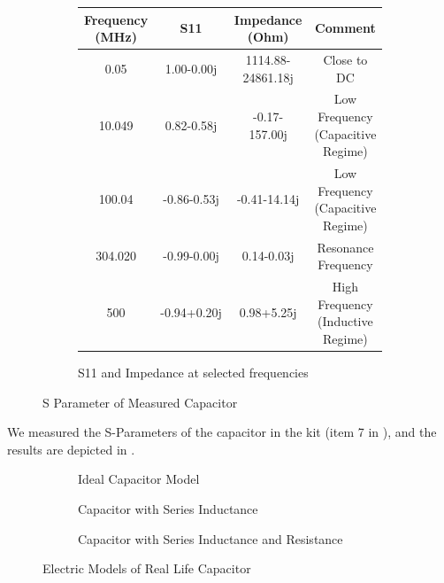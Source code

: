 \documentclass{article}
\begin{document}
\begin{figure}[h]
    \begin{subfigure}{\linewidth}
        \centering
        \begin{tabular}{ |c|c|c|c| }
            \hline
            Frequency (MHz) & S11         & Impedance (Ohm)   & Comment
            \\\hline
            0.05            & 1.00-0.00j  & 1114.88-24861.18j & Close to DC
            \\\hline
            10.049          & 0.82-0.58j  & -0.17-157.00j     & Low Frequency (Capacitive Regime)
            \\\hline
            100.04          & -0.86-0.53j & -0.41-14.14j      & Low Frequency (Capacitive Regime)
            \\\hline
            304.020         & -0.99-0.00j & 0.14-0.03j        & Resonance Frequency
            \\\hline
            500             & -0.94+0.20j & 0.98+5.25j        & High Frequency (Inductive Regime)
            \\\hline
        \end{tabular}
        \caption{S11 and Impedance at selected frequencies}
        \label{tab:capacitor_meas}
    \end{subfigure}

    \caption{S Parameter of Measured Capacitor}
    \label{fig:capacitor_meas}
\end{figure}

We measured the S-Parameters of the capacitor in the kit (item 7 in ), and the results are depicted in .

\begin{figure}
    \centering
    \begin{subfigure}{.5\linewidth}
        \centering
        \caption{Ideal Capacitor Model}
        \label{fig:capacitor_c}
    \end{subfigure}%
    \begin{subfigure}{.5\linewidth}
        \centering
        \caption{Capacitor with Series Inductance}
        \label{fig:capacitor_cl}
    \end{subfigure}%

    \begin{subfigure}{.5\linewidth}
        \centering
        \caption{Capacitor with Series Inductance and Resistance}
        \label{fig:capacitor_clr}
    \end{subfigure}%
    \caption{Electric Models of Real Life Capacitor}
\end{figure}
\end{document}
